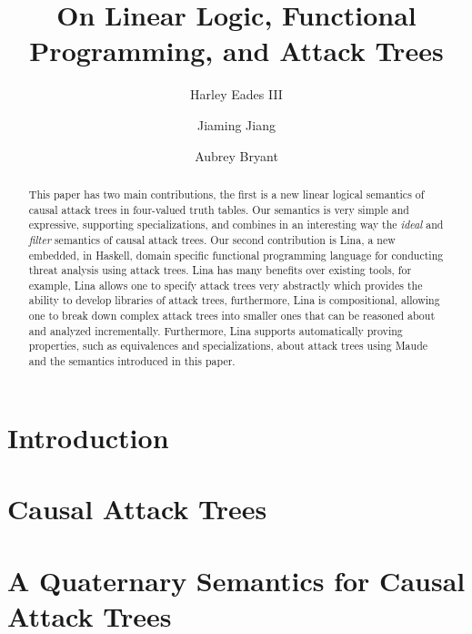 \documentclass{llncs}
\date{}
\begin{document}
\title{On Linear Logic, Functional Programming, and Attack Trees}

\author{Harley Eades III \and Jiaming Jiang \and Aubrey Bryant}


\maketitle

\begin{abstract}
  This paper has two main contributions, the first is a new linear
  logical semantics of causal attack trees in four-valued truth
  tables.  Our semantics is very simple and expressive, supporting
  specializations, and combines in an interesting way the \emph{ideal}
  and \emph{filter} semantics of causal attack trees. Our second
  contribution is Lina, a new embedded, in Haskell, domain specific
  functional programming language for conducting threat analysis using
  attack trees.  Lina has many benefits over existing tools, for
  example, Lina allows one to specify attack trees very abstractly
  which provides the ability to develop libraries of attack trees,
  furthermore, Lina is compositional, allowing one to break down
  complex attack trees into smaller ones that can be reasoned about
  and analyzed incrementally.  Furthermore, Lina supports
  automatically proving properties, such as equivalences and
  specializations, about attack trees using Maude and the semantics
  introduced in this paper.
\end{abstract}

\section{Introduction}
\label{sec:introduction}


\vspace{-7px}
\section{Causal Attack Trees}
\label{sec:causal_attack_trees}


\vspace{-7px}
\section{A Quaternary Semantics for Causal Attack Trees}
\label{sec:a_quaternary_semantics_for_causal_attack_trees}

\end{document}

